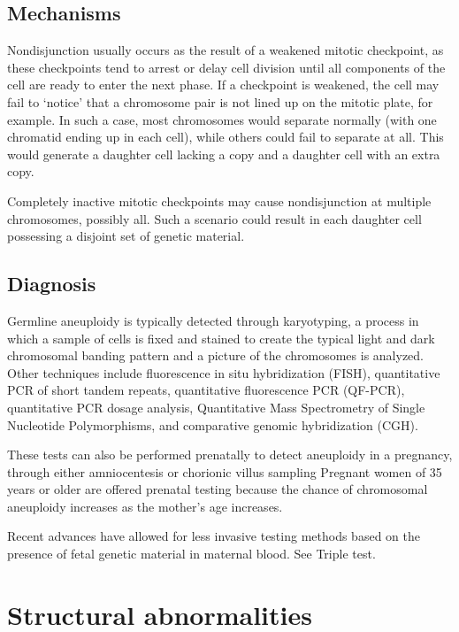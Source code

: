 \hypertarget{mechanisms}{%
\subsection{Mechanisms}\label{mechanisms}}

Nondisjunction usually occurs as the result of a weakened mitotic checkpoint, as these checkpoints tend to arrest or delay cell division until all components of the cell are ready to enter the next phase. If a checkpoint is weakened, the cell may fail to `notice' that a chromosome pair is not lined up on the mitotic plate, for example. In such a case, most chromosomes would separate normally (with one chromatid ending up in each cell), while others could fail to separate at all. This would generate a daughter cell lacking a copy and a daughter cell with an extra copy.

Completely inactive mitotic checkpoints may cause nondisjunction at multiple chromosomes, possibly all. Such a scenario could result in each daughter cell possessing a disjoint set of genetic material.

\hypertarget{diagnosis}{%
\subsection{Diagnosis}\label{diagnosis}}

Germline aneuploidy is typically detected through karyotyping, a process in which a sample of cells is fixed and stained to create the typical light and dark chromosomal banding pattern and a picture of the chromosomes is analyzed. Other techniques include fluorescence in situ hybridization (FISH), quantitative PCR of short tandem repeats, quantitative fluorescence PCR (QF-PCR), quantitative PCR dosage analysis, Quantitative Mass Spectrometry of Single Nucleotide Polymorphisms, and comparative genomic hybridization (CGH).

These tests can also be performed prenatally to detect aneuploidy in a pregnancy, through either amniocentesis or chorionic villus sampling Pregnant women of 35 years or older are offered prenatal testing because the chance of chromosomal aneuploidy increases as the mother's age increases.

Recent advances have allowed for less invasive testing methods based on the presence of fetal genetic material in maternal blood. See Triple test.

\hypertarget{structural-abnormalities}{%
\section{Structural abnormalities}\label{structural-abnormalities}}

